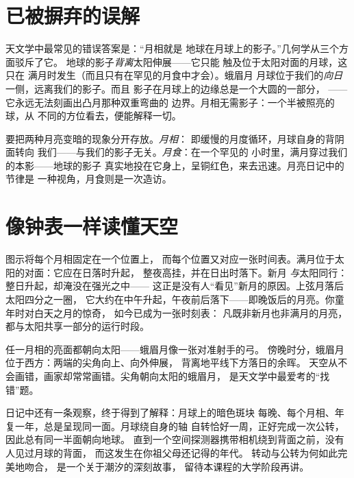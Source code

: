 \section{已被摒弃的误解}

\begin{proposition}[月相不是地球的影子]\label{prop:g7:moon-phases:notshadow}
天文学中最常见的错误答案是：“月相就是
地球在月球上的影子。”几何学从三个方面驳斥了它。
地球的影子\emph{背离}太阳伸展——它只能
触及位于太阳对面的月球，这只在
满月时发生（而且只有在罕见的月食中才会）。蛾眉月
月球位于我们的\emph{向日}一侧，远离我们的影子。而且
影子在月球上的边缘总是一个大圆的一部分，
——它永远无法刻画出凸月那种双重弯曲的
边界。月相无需影子：一个半被照亮的球，从
不同的方位看去，便能解释一切。
\end{proposition}

\begin{example}[月食与月相]\label{ex:g7:moon-phases:eclipsevs}
要把两种月亮变暗的现象分开存放。\emph{月相}：
即缓慢的月度循环，月球自身的背阴面转向
我们——与我们的影子无关。\emph{月食}：在一个罕见的
小时里，满月穿过我们的本影——地球的影子
真实地投在它身上，呈铜红色，来去迅速。月亮日记中的节律是
一种视角，月食则是一次造访。
\end{example}

\section{像钟表一样读懂天空}

\begin{example}[何时月相保有其时刻]\label{ex:g7:moon-phases:hours}
图示将每个月相固定在一个位置上，
而每个位置又对应一张时间表。满月位于太阳的对面：它应在日落时升起，
整夜高挂，并在日出时落下。新月
\emph{与}太阳同行：整日升起，却淹没在强光之中——
这正是没有人“看见”新月的原因。上弦月落后太阳四分之一圈，
它大约在中午升起，午夜前后落下——即晚饭后的月亮。你童年时对白天之月的惊奇，
如今已成为一张时刻表：
凡既非新月也非满月的月亮，
都与太阳共享一部分的运行时段。
\end{example}

\begin{example}[蛾眉月的尖角指向何方？]\label{ex:g7:moon-phases:points}
任一月相的亮面都朝向太阳——蛾眉月像一张对准射手的弓。
傍晚时分，蛾眉月位于西方：两端的尖角向上、向外伸展，
背离地平线下方落日的余晖。
天空从不会画错，画家却常常画错。尖角朝向太阳的蛾眉月，
是天文学中最爱考的“找错”题。
\end{example}

\begin{remark}[那张永不转开的脸]\label{rem:g7:moon-phases:sameface}
日记中还有一条观察，终于得到了解释：月球上的暗色斑块
每晚、每个月相、年复一年，总是呈现同一面。月球绕自身的轴
自转恰好一周，正好完成一次公转，因此总有同一半面朝向地球。
直到一个空间探测器携带相机绕到背面之前，没有人见过月球的背面，
而这发生在你祖父母还记得的年代。
转动与公转为何如此完美地吻合，
是一个关于潮汐的深刻故事，
留待本课程的大学阶段再讲。
\end{remark}

